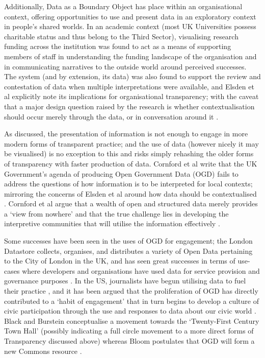 Additionally, Data as a Boundary Object has place within an organisational context, offering opportunities to use and present data in an exploratory context in people's shared worlds. In an academic context (most UK Universities possess charitable status and thus belong to the Third Sector), visualising research funding across the institution was found to act as a means of supporting members of staff in understanding the funding landscape of the organisation and in communicating narratives to the outside world around perceived successes. The system (and by extension, its data) was also found to support the review and contestation of data when multiple interpretations were available, and Elsden et al explicitly note its implications for organisational transparency; with the caveat that a major design question raised by the research is whether contextualisation should occur merely through the data, or in conversation around it \cite{elsden_resviz:_2016}.

As discussed, the presentation of information is not enough to engage in more modern forms of transparent practice; and the use of data (however nicely it may be visualised) is no exception to this and risks simply rehashing the older forms of transparency with faster production of data. Cornford et al write that the UK Government's agenda of producing Open Government Data (OGD) fails to address the questions of how information is to be interpreted for local contexts; mirroring the concerns of Elsden et al around how data should be contextualised \cite{cornford_local_2013}. Cornford et al argue that a wealth of open and structured data merely provides a `view from nowhere' and that the true challenge lies in developing the interpretive communities that will utilise the information effectively \cite{cornford_local_2013}.

Some successes have been seen in the uses of OGD for engagement; the London Datastore \cite{noauthor_london_nodate} collects, organises, and distributes a variety of Open Data pertaining to the City of London in the UK, and has seen great successes in terms of use-cases where developers and organisations have used data for service provision and governance purposes \cite{coleman_lessons_2013}. In the US, journalists have begun utilising data to fuel their practice \cite{ramos_journalists_2013}, and it has been argued that the proliferation of OGD has directly contributed to a `habit of engagement' that in turn begins to develop a culture of civic participation through the use and responses to data about our civic world \cite{gordon_making_2013-1}. Black and Burstein conceptualise a movement towards the `Twenty-First Century Town Hall' \cite{black_local_2013} (possibly indicating a full circle movement to a more direct forms of Transparency discussed above) whereas Bloom postulates that OGD will form a new Commons resource \cite{bloom_towards_2013}.

